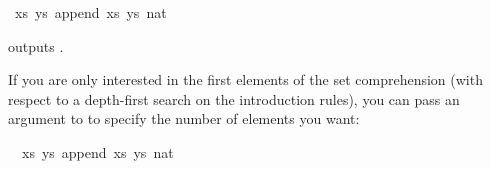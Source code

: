 \begin{isabellebody}
\ {}{}{}xs{}\ ys{}{}\ append\ xs\ ys\ {}{}{}{}{}nat{}{}{}{}{}{}%
\endisatagquote
{\isafoldquote}%
%
\isadelimquote
%
\endisadelimquote
%
\begin{isamarkuptext}%
\noindent outputs .%
\end{isamarkuptext}%
\isamarkuptrue%
%
\begin{isamarkuptext}%
\noindent If you are only interested in the first elements of the
  set comprehension (with respect to a depth-first search on the
  introduction rules), you can pass an argument to \hyperlink{command.values}{\mbox{}}
  to specify the number of elements you want:%
\end{isamarkuptext}%
\isamarkuptrue%
%
\isadelimquote
%
\endisadelimquote
%
\isatagquote
{}\isamarkupfalse%
\ {}\ {}{}{}xs{}\ ys{}{}\ append\ xs\ ys\ {}{}{}{}{}nat{}{}\ {}{}\ {}{}\ {}{}{}{}\isanewline

\end{isabellebody}
